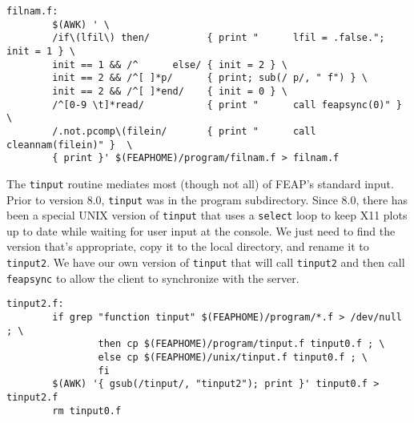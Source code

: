 \begin{verbatim}
filnam.f:
        $(AWK) ' \
        /if\(lfil\) then/          { print "      lfil = .false."; init = 1 } \
        init == 1 && /^      else/ { init = 2 } \
        init == 2 && /^[ ]*p/      { print; sub(/ p/, " f") } \
        init == 2 && /^[ ]*end/    { init = 0 } \
        /^[0-9 \t]*read/           { print "      call feapsync(0)" } \
        /.not.pcomp\(filein/       { print "      call cleannam(filein)" }  \
        { print }' $(FEAPHOME)/program/filnam.f > filnam.f

\end{verbatim}
 The {\tt tinput} routine mediates most (though not all) of 
 FEAP's standard input.  Prior to version 8.0, {\tt tinput} was in the
 program subdirectory.  Since 8.0, there has been a special UNIX version
 of {\tt tinput} that uses a {\tt select} loop to keep X11 plots up to
 date while waiting for user input at the console.  We just need to
 find the version that's appropriate, copy it to the local directory,
 and rename it to {\tt tinput2}.  We have our own version of {\tt tinput}
 that will call {\tt tinput2} and then call {\tt feapsync} to allow
 the client to synchronize with the server.
\begin{verbatim}
tinput2.f: 
        if grep "function tinput" $(FEAPHOME)/program/*.f > /dev/null ; \
                then cp $(FEAPHOME)/program/tinput.f tinput0.f ; \
                else cp $(FEAPHOME)/unix/tinput.f tinput0.f ; \
                fi
        $(AWK) '{ gsub(/tinput/, "tinput2"); print }' tinput0.f > tinput2.f
        rm tinput0.f

\end{verbatim}
